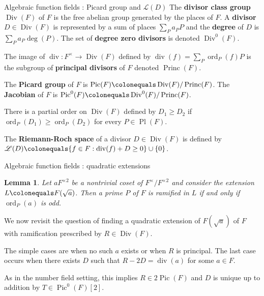 \documentclass[handout,xcolor=dvipsnames]{beamer}
\theoremstyle{plain}
\newtheorem*{lem}{Lemma}
\DeclareMathOperator{\Div}{Div}
\DeclareMathOperator{\Princ}{Princ}
\DeclareMathOperator{\Pic}{Pic}
\DeclareMathOperator{\ddiv}{div}
\DeclareMathOperator{\ord}{ord}
\DeclareMathOperator{\Pl}{Pl}
\begin{document}
  \begin{frame}{Algebraic function fields : Picard group and $\mathscr{L}(D)$}
    The \textbf{divisor class group}
    $\Div(F)$ of $F$ is the free abelian group
    generated by the places of $F$.
    A \textbf{divisor} $D\in\Div(F)$ is represented by
    a sum of places $\sum_{P}a_PP$
    and the \textbf{degree}
    of $D$ is $\sum_{P}a_P\deg(P)$.
    \newline
    The set of \textbf{degree zero divisors} is denoted
    $\Div^0(F)$.
    \par
    The image of $\ddiv\colon F^\times\to\Div(F)$ defined by
    $
      \ddiv(f) = \sum_{P}\ord_P(f)P
    $
    is the subgroup of
    \textbf{principal divisors} of $F$
    denoted $\Princ(F)$.
    \par
    The \textbf{Picard group} of $F$ is
    $\Pic(F)\colonequals\Div(F)/\Princ(F)$.
    \newline
    The \textbf{Jacobian} of $F$ is
    $\Pic^0(F)\colonequals\Div^0(F)/\Princ(F)$.
    \par
    There is a partial order on $\Div(F)$
    defined by $D_1\geq D_2$ if
    $\ord_P(D_1)\geq\ord_P(D_2)$ for
    every $P\in\Pl(F)$.
    \par
    The \textbf{Riemann-Roch space} of a divisor
    $D\in\Div(F)$ is defined by
    $\mathscr{L}(D)\colonequals\{f\in F : \ddiv(f)+D\geq 0\}\cup\{0\}$.
  \end{frame}
  \begin{frame}{Algebraic function fields : quadratic extensions}
    \begin{lem}
      \vspace{1pt}
      Let $aF^{\times 2}$ be a nontrivial coset of
      $F^\times/F^{\times 2}$ and consider the
      extension $L\colonequals F(\sqrt{a})$.
      Then a prime $P$ of $F$ is
      ramified in $L$
      if and only if
      $\ord_P(a)$ is odd.
    \end{lem}
    We now revisit the question of finding a quadratic extension
    of $F(\sqrt{a})$ of $F$ with ramification prescribed
    by $R\in\Div(F)$.
    \par
    The simple cases are when no such $a$ exists
    or when $R$ is principal.
    The last case occurs when there exists
    $D$ such that $R-2D=\ddiv(a)$ for some $a\in F$.
    \par
    As in the number field setting, this implies
    $R\in 2\Pic(F)$ and $D$ is unique up to
    addition by $T\in\Pic^0(F)[2]$.
  \end{frame}
\end{document}
